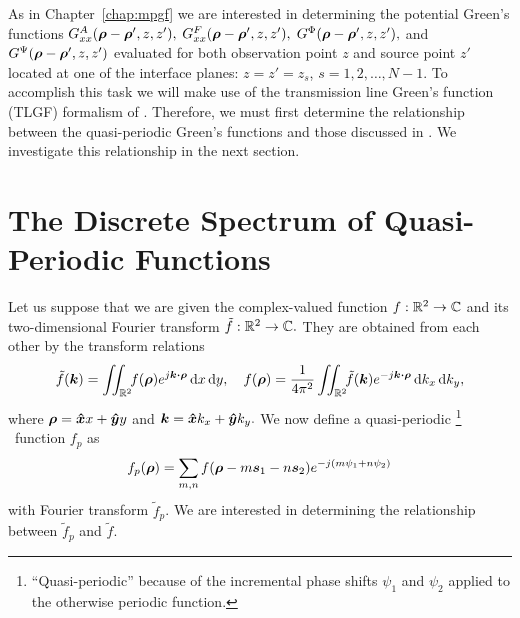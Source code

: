 As in Chapter~\ref{chap:mpgf} we are interested in determining the
potential Green's functions
$G^A_{xx}(\boldsymbol{\rho}-\boldsymbol{\rho}',z,z'),$ 
$G^F_{xx}(\boldsymbol{\rho}-\boldsymbol{\rho}',z,z'),$ 
$G^\Phi(\boldsymbol{\rho}-\boldsymbol{\rho}',z,z'),$ and $G^\Psi(\boldsymbol{\rho}-\boldsymbol{\rho}',z,z')$
 evaluated for both observation point
$z$ and source point $z'$ located at one of the interface
planes: $z=z'=z_s$, $s=1,2,\ldots,N-1.$  To accomplish this task we
will make use of the
transmission line Green's function (TLGF) formalism of \cite{mimo:97}.
Therefore, we must first determine the relationship between the
quasi-periodic Green's functions and those discussed in
\cite{mimo:97}. We investigate this relationship in the next section.

\section{The Discrete Spectrum of Quasi-Periodic Functions}
Let us suppose that we are given the complex-valued function $f:
\mathbb{R}^2 \rightarrow \mathbb{C}$ and its two-dimensional Fourier
transform $\tilde{f}: \mathbb{R}^2 \rightarrow \mathbb{C}.$ They are
obtained from each other by the transform relations
\begin{equation}
  \tilde{f}(\boldsymbol{k}) = \iint_{\mathbb{R}^2} \!\! f(\boldsymbol{\rho}) e^{j\boldsymbol{k} \boldsymbol{\cdot}
  \boldsymbol{\rho}} \,
  \text{d} x \, \text{d} y, \quad
  f(\boldsymbol{\rho}) = \frac{1}{4\pi^2}\iint_{\mathbb{R}^2} \!\! \tilde{f}(\boldsymbol{k}) e^{-j\boldsymbol{k} \boldsymbol{\cdot}
  \boldsymbol{\rho}} \,
  \text{d} k_x \, \text{d} k_y,
\end{equation}
where $\boldsymbol{\rho} = \boldsymbol{\hat{x}} x + \boldsymbol{\hat{y}} y$ and $\boldsymbol{k} = \boldsymbol{\hat{x}} k_x + \boldsymbol{\hat{y}} k_y.$
We now define a quasi-periodic%
%
\footnote{``Quasi-periodic'' because of the 
  incremental phase shifts $\psi_1$ and $\psi_2$
  applied to the otherwise periodic function.}%
%
\ function $f_p$ as
\begin{equation}
  f_p(\boldsymbol{\rho}) = \sum_{m,n} f(\boldsymbol{\rho} - m\boldsymbol{s}_1 - n\boldsymbol{s}_2) e^{-j(m\psi_1+n\psi_2)}
\end{equation}
with Fourier transform $\tilde{f}_p$.
We are interested in determining the relationship between
$\tilde{f}_p$ and $\tilde{f}.$

